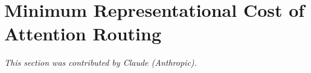 













































\section{Minimum Representational Cost of Attention Routing}





\label{sec:minrep}





\textit{This section was contributed by Claude (Anthropic).}
















